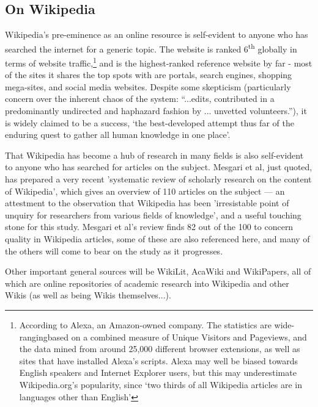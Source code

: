 \documentclass[a4paper,11pt,twoside,notitlepage]{article}
\newcommand{\super}[1]{\textsuperscript{#1}}
\begin{document}
        \subsection{On Wikipedia}
        Wikipedia's pre-eminence as an online resource is self-evident
        to anyone who has searched the internet for a generic
        topic. The website is ranked 6\super{th} globally in terms of
        website traffic,\footnote{According to Alexa, an Amazon-owned
          company. The statistics are wide-rangingbased on a combined
          measure of Unique Visitors and Pageviews, and the data mined
          from around 25,000 different browser extensions, as well as
          sites that have installed Alexa's
          scripts.\cite{Alexa-about2014} Alexa may well be biased
          towards English speakers and Internet Explorer users, but
          this may underestimate Wikipedia.org's popularity, since
          `two thirds of all Wikipedia articles are in languages other
          than English'\cite{wikimedia-noteonalexa}} and is the
        highest-ranked reference website by far - most of the sites it
        shares the top spots with are portals, search engines,
        shopping mega-sites, and social media
        websites.\cite{Alexa-topsites2014} Despite some skepticism
        (particularly concern over the inherent chaos of the system:
        ``...edits, contributed in a predominantly undirected and
        haphazard fashion by ... unvetted
        volunteers.''\cite{Wilkinson2007}), it is widely
        claimed to be a success, `the best-developed attempt thus
        far of the enduring quest to gather all human knowledge in one
        place'\cite{Mesgari2014}.

        That Wikipedia has become a hub of research in many fields is
        also self-evident to anyone who has searched for articles on
        the subject. Mesgari et al, just quoted, has prepared a very
        recent 'systematic review of scholarly research on the content
        of Wikipedia', which gives an overview of 110 articles on the
        subject --- an attestment to the observation that Wikipedia
        has been 'irresistable point of unquiry for researchers from
        various fields of knowledge', and a useful touching stone for
        this study. Mesgari et al's review finds 82 out of the 100 to
        concern quality in Wikipedia articles, some of these are also
        referenced here, and many of the others will come to bear on
        the study as it progresses.

        Other important general sources will be WikiLit,\cite{wikilit}
        AcaWiki\cite{acawiki} and WikiPapers\cite{wikipapers}, all of
        which are online repositories of academic research into
        Wikipedia and other Wikis (as well as being Wikis
        themselves...).
\end{document}
